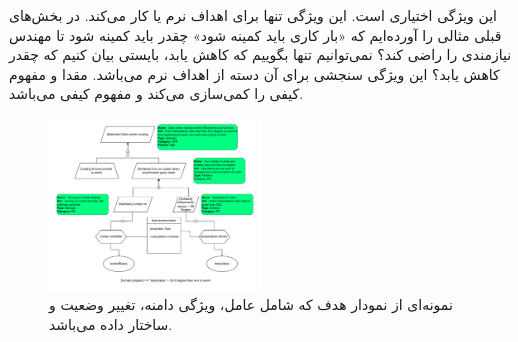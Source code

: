 این ویژگی اختیاری است. این ویژگی تنها برای اهداف نرم یا  کار
می‌کند. در بخش‌های قبلی مثالی را آورده‌ایم که «بار کاری باید کمینه شود» چقدر
باید کمینه شود تا مهندس نیازمندی را راضی کند؟ نمی‌توانیم تنها بگوییم که کاهش
یابد، بایستی بیان کنیم که چقدر کاهش یابد؟ این ویژگی سنجشی برای آن دسته از اهداف
نرم می‌باشد. مقدا و مفهوم کیفی را کمی‌سازی می‌کند و مفهوم کیفی 
می‌باشد.

\begin{figure}[H]
    \centering
    \includegraphics[width=0.5\textwidth]{assets/exp_1.drawio.pdf}
    \caption{نمونه‌ای از نمودار هدف که شامل عامل، ویژگی دامنه، تغییر وضعیت و
    ساختار داده می‌باشد.}
\end{figure}
